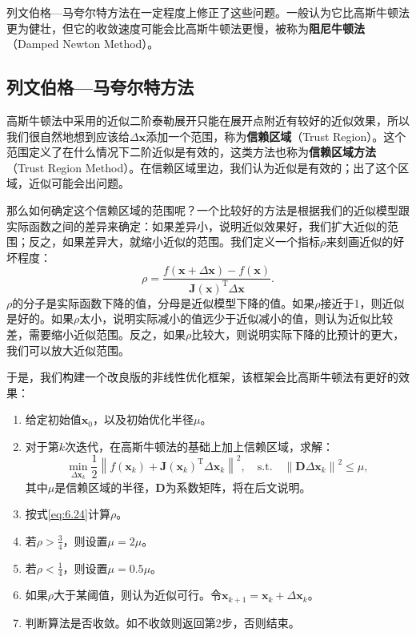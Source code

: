 列文伯格—马夸尔特方法在一定程度上修正了这些问题。一般认为它比高斯牛顿法更为健壮，但它的收敛速度可能会比高斯牛顿法更慢，被称为\textbf{阻尼牛顿法}（Damped Newton Method）。

\subsection{列文伯格—马夸尔特方法}
高斯牛顿法中采用的近似二阶泰勒展开只能在展开点附近有较好的近似效果，所以我们很自然地想到应该给$\Delta \bm{x}$添加一个范围，称为\textbf{信赖区域}（Trust Region）。这个范围定义了在什么情况下二阶近似是有效的，这类方法也称为\textbf{信赖区域方法}（Trust Region Method）。在信赖区域里边，我们认为近似是有效的；出了这个区域，近似可能会出问题。

那么如何确定这个信赖区域的范围呢？一个比较好的方法是根据我们的近似模型跟实际函数之间的差异来确定：如果差异小，说明近似效果好，我们扩大近似的范围；反之，如果差异大，就缩小近似的范围。我们定义一个指标$\rho$来刻画近似的好坏程度：
\begin{equation}\label{eq:6.24}
\rho  = \frac{{f\left( {\bm{x} + \Delta \bm{x}} \right)}  - {{ {f\left( \bm{x} \right)} }}}{ \bm{J}\left( \bm{x} \right)^\mathrm{T} \Delta \bm{x} } .
\end{equation}
$\rho$的分子是实际函数下降的值，分母是近似模型下降的值。如果$\rho$接近于1，则近似是好的。如果$\rho$太小，说明实际减小的值远少于近似减小的值，则认为近似比较差，需要缩小近似范围。反之，如果$\rho$比较大，则说明实际下降的比预计的更大，我们可以放大近似范围。

于是，我们构建一个改良版的非线性优化框架，该框架会比高斯牛顿法有更好的效果：

\begin{mdframed}
\begin{enumerate}
	\item 给定初始值$\bm{x}_0$，以及初始优化半径$\mu$。
	\item 对于第$k$次迭代，在高斯牛顿法的基础上加上信赖区域，求解：
	\begin{equation}\label{eq:LM}
	\mathop {\min }\limits_{\Delta \bm{x}_k} \frac{1}{2}{\left\| {f\left( \bm{x}_k \right) + \bm{J} \left( \bm{x}_k \right)^\mathrm{T} \Delta \bm{x}_k} \right\|^2}, \quad \mathrm{s.t.}\quad {\left\| {\bm{D} \Delta \bm{x}_k} \right\|^2} \leqslant \mu ,
	\end{equation}
	其中$\mu$是信赖区域的半径，$\bm{D}$为系数矩阵，将在后文说明。
	\item 按式\eqref{eq:6.24}计算$\rho$。
	\item 若$\rho > \frac{3}{4}$，则设置$\mu = 2 \mu$。
	\item 若$\rho < \frac{1}{4}$，则设置$\mu = 0.5 \mu$。
	\item 如果$\rho$大于某阈值，则认为近似可行。令$\bm{x}_{k+1} = \bm{x}_k+\Delta \bm{x}_k$。
	\item 判断算法是否收敛。如不收敛则返回第2步，否则结束。
\end{enumerate}
\end{mdframed}

